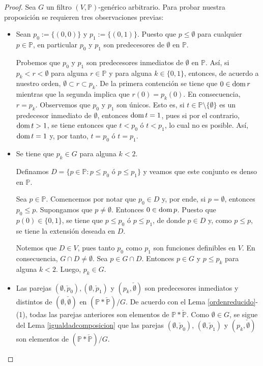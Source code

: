 \documentclass[11pt]{unam_tesis1}
\theoremstyle{MyThmStyle}
\theoremstyle{definition}
\theoremstyle{plain}
\theoremstyle{remark}
\def\dom{\mathop{\rm dom}\nolimits}
\let\leq\leqslant
\begin{document}
\begin{proof}
Sea $G$ un filtro $(V,\mathbb P)$-gen\'erico arbitrario. Para probar nuestra proposici\'on se requieren tres observaciones previas:

\begin{itemize}

\item [(i)] Sean $p_0:=\{(0,0)\}$ y $p_1:=\{(0,1)\}$. Puesto que $p\leq \emptyset$ para cualquier $p\in \mathbb P$, en particular $p_0$ y $p_1$ son predecesores de $\emptyset$ en $\mathbb P$.

Probemos que $p_0$ y $p_1$ son predecesores inmediatos de $\emptyset$ en $\mathbb P$. As\'i, si $p_k<r<\emptyset$ para alguna $r\in \mathbb P$ y para alguna $k\in \{0,1 \}$, entonces, de acuerdo a nuestro orden, $\emptyset\subset r\subset p_k$. De la primera contenci\'on se tiene que $0\in \dom r$ mientras que la segunda implica que $r(0)=p_k(0)$. En consecuencia, $r=p_k$. Observemos que $p_0$ y $p_1$ son \'unicos. Esto es, si $t\in \mathbb P\setminus \{\emptyset \}$ es un predecesor inmediato de $\emptyset$, entonces $\dom t=1$, pues si por el contrario, $\dom t>1$, se tiene entonces que $t< p_0$ \'o $t<p_1$, lo cual no es posible. As\'i, $\dom t=1$ y, por tanto, $t=p_0$ \'o $t=p_1$.

\item [(ii)] Se tiene que $p_k\in G$ para alguna $k<2$.

Definamos $D=\{p\in \mathbb P:p\leq p_0$ \'o $p\leq p_1 \}$ y veamos que este conjunto es denso en $\mathbb P$.

Sea $p\in \mathbb P$. Comencemos por notar que $p_0 \in D$ y, por ende, si $p = \emptyset$, entonces $p_0 \leq p$. Supongamos que $p\neq \emptyset$. Entonces $0\in \dom p$. Puesto que $p(0)\in \{0,1\}$, se tiene que $p\leq p_0$ \'o $p\leq p_1$, de donde $p\in D$ y, como $p\leq p$, se tiene la extensi\'on deseada en $D$.

Notemos que $D\in V$, pues tanto $p_0$ como $p_1$ son funciones definibles en $V$. En consecuencia, $G\cap D\neq \emptyset$. Sea $p\in G\cap D$. Entonces $p\in G$ y $p\leq p_k$ para alguna $k<2$. Luego, $p_k\in G$.

\item[(iii)] Las parejas $(\emptyset,\check{p}_0), (\emptyset,\check{p}_1)$ y $(p_k,\check{\emptyset})$ son predecesores inmediatos y distintos de $(\emptyset,\check{\emptyset})$ en $(\mathbb P*\check{\mathbb P})/G$. De acuerdo con el Lema \ref{ordenreducido}-(1), todas las parejas anteriores son elementos de $\mathbb P*\check{\mathbb P}$. Como $\emptyset \in G$, se sigue del Lema \ref{igualdadcomposicion} que las parejas $(\emptyset,\check p_0)$, $(\emptyset,\check p_1)$ y  $(p_k,\check{\emptyset})$ son elementos de $(\mathbb P*\check{\mathbb P})/G$.


\end{itemize}
\end{proof}
\end{document}
